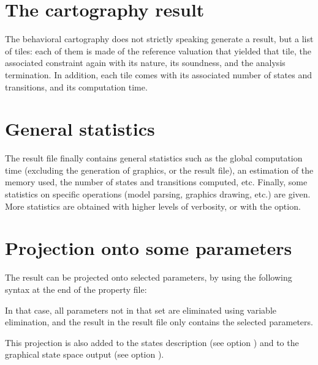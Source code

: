 \section{The cartography result}

The behavioral cartography does not strictly speaking generate a result, but a list of tiles: each of them is made of the reference valuation that yielded that tile, the associated constraint again with its nature, its soundness, and the analysis termination.
In addition, each tile comes with its associated number of states and transitions, and its computation time.



\section{General statistics}

The result file finally contains general statistics such as the global computation time (excluding the generation of graphics, or the result file), an estimation of the memory used, the number of states and transitions computed, etc.
Finally, some statistics on specific operations (model parsing, graphics drawing, etc.) are given.
More statistics are obtained with higher levels of verbosity, or with the  option.

\section{Projection onto some parameters}\label{section:projection}
The result can be projected onto selected parameters, by using the following syntax at the end of the property file:


In that case, all parameters not in that set are eliminated using variable elimination, and the result in the result file only contains the selected parameters.

This projection is also added to the states description (see option ) and to the graphical state space output (see option ).






